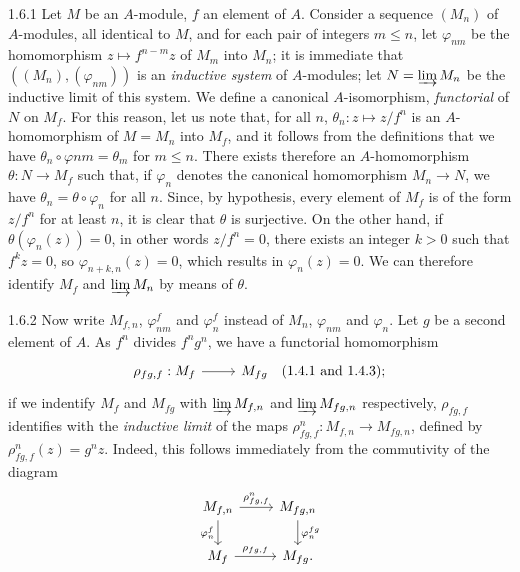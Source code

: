 \documentclass[../main.tex]{subfiles}
\begin{document}
\begin{env}{1.6.1}
Let $M$ be an $A$-module, $f$ an element of $A$. Consider a sequence
$(M_n)$ of $A$-modules, all identical to $M$, and for each pair of integers
$m\leq n$, let $\varphi_{nm}$ be the homomorphism $z\mapsto f^{n-m}z$ of $M_m$
into $M_n$; it is immediate that $((M_n),(\varphi_{nm}))$ is an \emph{inductive system}
of $A$-modules; let $N=\varinjlim M_n$ be the inductive limit of this system. We define
a canonical $A$-isomorphism, \emph{functorial} of $N$ on $M_f$. For this reason, let us
note that, for all $n$, $\theta_n:z\mapsto z/f^n$ is an $A$-homomorphism of $M=M_n$ into
$M_f$, and it follows from the definitions that we have $\theta_n\circ\varphi{nm}=\theta_m$
for $m\leq n$. There exists therefore an $A$-homomorphism $\theta:N\to M_f$ such that, if
$\varphi_n$ denotes the canonical homomorphism $M_n\to N$, we have $\theta_n=\theta\circ\varphi_n$
for all $n$. Since, by hypothesis, every element of $M_f$ is of the form $z/f^n$ for at least $n$,
it is clear that $\theta$ is surjective. On the other hand, if $\theta(\varphi_n(z))=0$,
in other words $z/f^n=0$, there exists an integer $k>0$ such that $f^k z=0$, so $\varphi_{n+k,n}(z)=0$,
which results in $\varphi_n(z)=0$. We can therefore identify $M_f$ and $\varinjlim M_n$ by means
of $\theta$.
\end{env}

\begin{env}{1.6.2}
Now write $M_{f,n}$, $\varphi_{nm}^f$ and $\varphi_n^f$ instead of $M_n$, $\varphi_{nm}$ and
$\varphi_n$. Let $g$ be a second element of $A$. As $f^n$ divides $f^n g^n$, we have a functorial
homomorphism
\[\begin{tikzcd}
  \rho_{fg,f}:M_f\ar[r] & M_{fg}\quad(1.4.1\text{ and }1.4.3);
\end{tikzcd}\]
if we indentify $M_f$ and $M_{fg}$ with $\varinjlim M_{f,n}$ and $\varinjlim M_{fg,n}$
respectively, $\rho_{fg,f}$ identifies with the \emph{inductive limit} of the maps
$\rho_{fg,f}^n:M_{f,n}\to M_{fg,n}$, defined by $\rho_{fg,f}^n(z)=g^n z$. Indeed, this follows
immediately from the commutivity of the diagram
\[\begin{tikzcd}
  M_{f,n}\ar[r,"\rho_{fg,f}^n"]\ar[d,"\varphi_n^f"'] & M_{fg,n}\ar[d,"\varphi_n^{fg}"]\\
  M_f\ar[r,"\rho_{fg,f}"] & M_{fg}.
\end{tikzcd}\]
\end{env}
\end{document}
